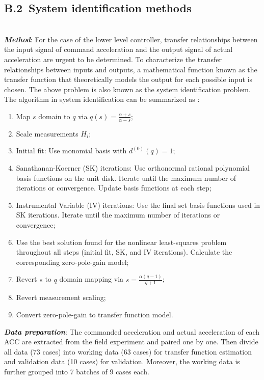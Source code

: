 \documentclass[a4paper]{cas-sc}
\begin{document}
\subsection*{B.2~System identification methods}
\label{Section B.2}
~\\
\textbf{\emph{Method}}: For the case of the lower level controller, transfer relationships between the input signal of command acceleration and the output signal of actual acceleration are urgent to be determined. To characterize the transfer relationships between inputs and outputs, a mathematical function known as the transfer function that theoretically models the output for each possible input is chosen. The above problem is also known as the system identification problem. The algorithm in system identification can be summarized as \citep{Ozdemir2017a,Kollar2006a,Ljung1995a}:
\begin{enumerate}
  \item Map $s$ domain to $q$ via $q(s)=\frac{\alpha+s}{\alpha-s}$;
  \item Scale measurements $H_i$;
  \item Initial fit: Use monomial basis with $d^{(0)}(q)=1$;
  \item Sanathanan-Koerner (SK) iterations: Use orthonormal rational polynomial basis functions on the unit disk. Iterate until the maximum number of iterations or convergence. Update basis functions at each step;
  \item Instrumental Variable (IV) iterations: Use the final set basis functions used in SK iterations. Iterate until the maximum number of iterations or convergence;
  \item Use the best solution found for the nonlinear least-squares problem throughout all steps (initial fit, SK, and IV iterations). Calculate the corresponding zero-pole-gain model;
  \item Revert $s$ to $q$ domain mapping via $s=\frac{\alpha(q-1)}{q+1}$;
  \item Revert measurement scaling;
  \item Convert zero-pole-gain to transfer function model.
\end{enumerate}

\textbf{\emph{Data preparation}}: The commanded acceleration and actual acceleration of each ACC are extracted from the field experiment and paired one by one. Then divide all data (73 cases) into working data (63 cases) for transfer function estimation and validation data (10 cases) for validation. Moreover, the working data is further grouped into 7 batches of 9 cases each.
\end{document}
